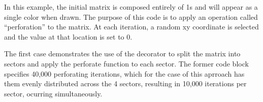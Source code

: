 \documentclass[letterpaper,10pt,english]{sphinxmanual}
\let\sphinxpxdimen\pdfpxdimen\else\newdimen\sphinxpxdimen
\begin{document}
\begin{sphinxVerbatim}[commandchars=\\\{\}]
   
   
   
   

  

 
      


  

\end{sphinxVerbatim}

\noindent\sphinxincludegraphics[width=320\sphinxpxdimen]{{black_canvas}.png}

\sphinxAtStartPar
In this example, the initial matrix is composed entirely of 1s and will appear as a single color when drawn.
The purpose of this code is to apply an operation called “perforation” to the matrix. At each iteration,
a random x\sphinxhyphen{}y coordinate is selected and the value at that location is set to 0.

\sphinxAtStartPar
The first case demonstrates the use of the  decorator to split the matrix into sectors and apply
the perforate function to each sector. The former code block specifies 40,000 perforating iterations, which for the case
of this aprroach has them evenly distributed across the 4 sectors, resulting in 10,000 iterations per sector, ocurring simultaneously.
\end{document}
